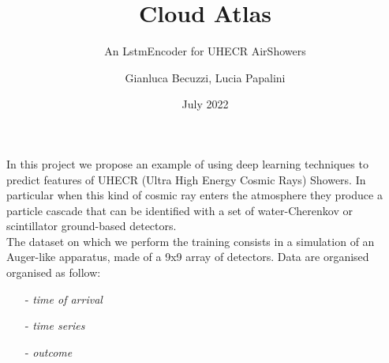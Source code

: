 \documentclass{article}
\title{Cloud Atlas}
\subtitle{An LstmEncoder for UHECR AirShowers}
\author{Gianluca Becuzzi, Lucia Papalini}
\date{July 2022}
\begin{document}
\maketitle

In this project we propose an example of using deep learning techniques to predict features of UHECR 
(Ultra High Energy Cosmic Rays) Showers.
In particular when this kind of cosmic ray enters the atmosphere they produce a particle cascade 
that can be identified with a set of water-Cherenkov or scintillator ground-based detectors.\\
The dataset on which we perform the training consists in a simulation of an Auger-like apparatus, 
made of a 9x9 array of detectors.  Data are organised organised as follow:
\begin{itemize}  %
    \item[-]\textit{time of arrival}
    \item[-]\textit{time series}
    \item[-]\textit{outcome}
\end{itemize}
\end{document}
